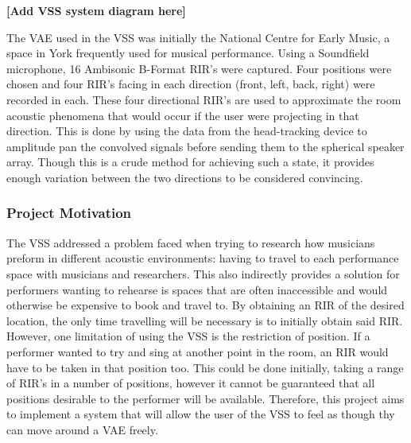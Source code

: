 \documentclass[../../main.tex]{subfiles}
\begin{document}
		\begin{center}
			\textbf{[Add VSS system diagram here]}
		\end{center}

		The \ac{VAE} used in the \ac{VSS} was initially the National Centre for Early Music, a space in York frequently used for musical performance. Using a Soundfield microphone, 16 Ambisonic B-Format \ac{RIR}'s were captured. Four positions were chosen and four \ac{RIR}'s facing in each direction (front, left, back, right) were recorded in each. These four directional \ac{RIR}'s are used to approximate the room acoustic phenomena that would occur if the user were projecting in that direction. This is done by using the data from the head-tracking device to amplitude pan the convolved signals before sending them to the spherical speaker array. Though this is a crude method for achieving such a state, it provides enough variation between the two directions to be considered convincing.


		\subsubsection{Project Motivation}
			

			The \ac{VSS} addressed a problem faced when trying to research how musicians preform in different acoustic environments: having to travel to each performance space with musicians and researchers. This also indirectly provides a solution for performers wanting to rehearse is spaces that are often inaccessible and would otherwise be expensive to book and travel to. By obtaining an \ac{RIR} of the desired location, the only time travelling will be necessary is to initially obtain said \ac{RIR}. However, one limitation of using the \ac{VSS} is the restriction of position. If a performer wanted to try and sing at another point in the room, an \ac{RIR} would have to be taken in that position too. This could be done initially, taking a range of \ac{RIR}'s in a number of positions, however it cannot be guaranteed that all positions desirable to the performer will be available. Therefore, this project aims to implement a system that will allow the user of the \ac{VSS} to feel as though thy can move around a \ac{VAE} freely.

\end{document}
